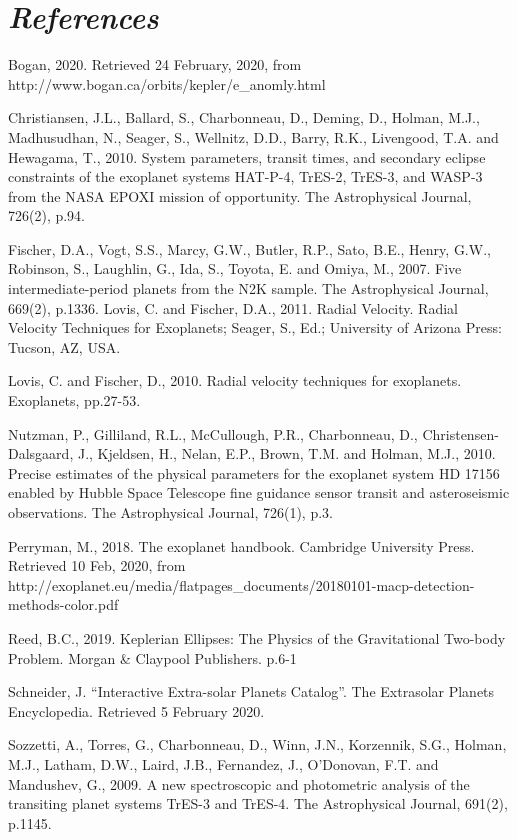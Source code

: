 \documentclass[11pt]{article}
\begin{document}
    \hypertarget{references}{%
\section*{\texorpdfstring{\emph{References}}{References}}\label{references}}


Bogan, 2020. Retrieved 24 February, 2020, from
http://www.bogan.ca/orbits/kepler/e\_anomly.html

Christiansen, J.L., Ballard, S., Charbonneau, D., Deming, D., Holman,
M.J., Madhusudhan, N., Seager, S., Wellnitz, D.D., Barry, R.K.,
Livengood, T.A. and Hewagama, T., 2010. System parameters, transit
times, and secondary eclipse constraints of the exoplanet systems
HAT-P-4, TrES-2, TrES-3, and WASP-3 from the NASA EPOXI mission of
opportunity. The Astrophysical Journal, 726(2), p.94.

Fischer, D.A., Vogt, S.S., Marcy, G.W., Butler, R.P., Sato, B.E., Henry,
G.W., Robinson, S., Laughlin, G., Ida, S., Toyota, E. and Omiya, M.,
2007. Five intermediate-period planets from the N2K sample. The
Astrophysical Journal, 669(2), p.1336. Lovis, C. and Fischer, D.A.,
2011. Radial Velocity. Radial Velocity Techniques for Exoplanets;
Seager, S., Ed.; University of Arizona Press: Tucson, AZ, USA.

Lovis, C. and Fischer, D., 2010. Radial velocity techniques for
exoplanets. Exoplanets, pp.27-53.

Nutzman, P., Gilliland, R.L., McCullough, P.R., Charbonneau, D.,
Christensen-Dalsgaard, J., Kjeldsen, H., Nelan, E.P., Brown, T.M. and
Holman, M.J., 2010. Precise estimates of the physical parameters for the
exoplanet system HD 17156 enabled by Hubble Space Telescope fine
guidance sensor transit and asteroseismic observations. The
Astrophysical Journal, 726(1), p.3.

Perryman, M., 2018. The exoplanet handbook. Cambridge University Press.
Retrieved 10 Feb, 2020, from
http://exoplanet.eu/media/flatpages\_documents/20180101-macp-detection-methods-color.pdf

Reed, B.C., 2019. Keplerian Ellipses: The Physics of the Gravitational
Two-body Problem. Morgan \& Claypool Publishers. p.6-1

Schneider, J. ``Interactive Extra-solar Planets Catalog''. The
Extrasolar Planets Encyclopedia. Retrieved 5 February 2020.

Sozzetti, A., Torres, G., Charbonneau, D., Winn, J.N., Korzennik, S.G.,
Holman, M.J., Latham, D.W., Laird, J.B., Fernandez, J., O'Donovan, F.T.
and Mandushev, G., 2009. A new spectroscopic and photometric analysis of
the transiting planet systems TrES-3 and TrES-4. The Astrophysical
Journal, 691(2), p.1145.
\end{document}
